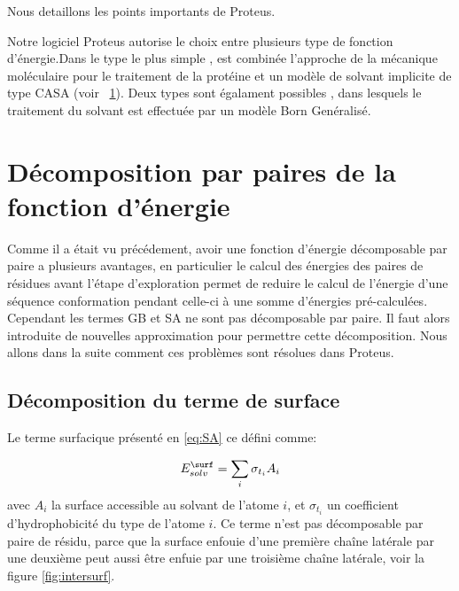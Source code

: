 Nous detaillons les points importants de Proteus.

Notre logiciel Proteus autorise le choix entre plusieurs type de fonction d'énergie.Dans le type le plus simple \ogMMCASA\fg, est combinée l'approche de la mécanique moléculaire pour le traitement de la protéine et un modèle de solvant implicite de type CASA (voir  ~\ref{}). Deux types \ogLLGBSA\fg sont égalament possibles , dans lesquels le traitement du solvant est effectuée par un modèle Born Genéralisé.

\section{Décomposition par paires de la fonction d'énergie}
Comme il a était vu précédement, avoir une fonction d'énergie décomposable par paire a plusieurs avantages, en particulier le calcul des énergies des paires de résidues avant l'étape d'exploration permet de reduire le calcul de l'énergie d'une séquence conformation pendant celle-ci à une somme d'énergies pré-calculées. Cependant les termes GB et SA ne sont pas décomposable par paire. Il faut alors introduite de nouvelles approximation pour permettre cette décomposition. Nous allons dans la suite comment ces problèmes sont résolues dans Proteus.
\subsection{Décomposition du terme de surface}
\label{sub:surpairwise}

Le terme surfacique présenté en \ref{eq:SA} ce défini comme:

\begin{equation}
E_{solv}^\surf = \sum_i \sigma_{t_i} A_i 
\end{equation}
avec $A_i$ la surface accessible au solvant de l'atome $i$, et $\sigma_{t_i}$ un coefficient d'hydrophobicité du type de l'atome $i$.
Ce terme n'est pas décomposable par paire de résidu, parce que la surface enfouie d'une première chaîne latérale par une deuxième  peut aussi être enfuie par une troisième chaîne latérale, voir la figure \ref{fig:intersurf}.


